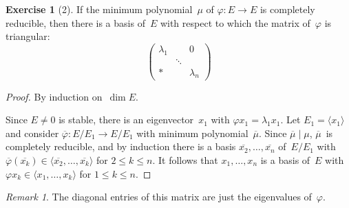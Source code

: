\documentclass[letterpaper,12pt]{article}
\newcommand{\divides}{\mid}
\newcommand{\gen}[1]{\langle#1\rangle}
\newcommand{\proj}[1]{\overline{#1}}
\theoremstyle{definition}
\newtheorem*{exer}{Exercise}
\theoremstyle{remark}
\newtheorem*{rmk}{Remark}
\begin{document}
\begin{exer}[2]
If the minimum polynomial~\(\mu\) of \(\varphi:E\to E\) is completely reducible, then there is a basis of~\(E\) with respect to which the matrix of~\(\varphi\) is triangular:
\[\begin{pmatrix}
\lambda_1&&0\\
&\ddots&\\
*&&\lambda_n
\end{pmatrix}\]
\end{exer}
\begin{proof}
By induction on~\(\dim E\).

Since \(E\ne 0\) is stable, there is an eigenvector~\(x_1\) with \(\varphi x_1=\lambda_1 x_1\). Let \(E_1=\gen{x_1}\) and consider \(\proj{\varphi}:E/E_1\to E/E_1\) with minimum polynomial~\(\proj{\mu}\). Since \(\proj{\mu}\divides\mu\), \(\proj{\mu}\)~is completely reducible, and by induction there is a basis \(\proj{x_2},\ldots,\proj{x_n}\) of~\(E/E_1\) with \(\proj{\varphi}(\proj{x_k})\in\gen{\proj{x_2},\ldots,\proj{x_k}}\) for \(2\le k\le n\). It follows that \(x_1,\ldots,x_n\) is a basis of~\(E\) with \(\varphi x_k\in\gen{x_1,\ldots,x_k}\) for \(1\le k\le n\).
\end{proof}
\begin{rmk}
The diagonal entries of this matrix are just the eigenvalues of~\(\varphi\).
\end{rmk}
\end{document}
